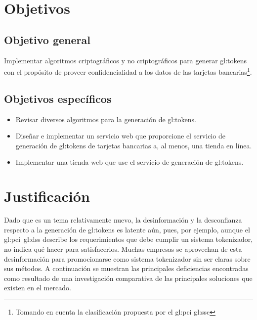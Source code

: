 \section{Objetivos}

\subsection{Objetivo general}

Implementar algoritmos criptográficos y no criptográficos para generar
\glspl{gl:token} con el propósito de proveer confidencialidad a los datos de las
tarjetas bancarias\footnote{Tomando en cuenta la clasificación propuesta por el
\gls{gl:pci} \gls{gl:ssc}}.

\subsection{Objetivos específicos}

\begin{itemize}
  \item Revisar diversos algoritmos para la generación de \glspl{gl:token}.
  \item Diseñar e implementar un servicio web que proporcione el servicio de
    generación de \glspl{gl:token} de tarjetas bancarias a, al menos, una tienda
    en línea.
  \item Implementar una tienda web que use el servicio de generación de
    \glspl{gl:token}.
\end{itemize}

\section{Justificación}

Dado que es un tema relativamente nuevo, la desinformación y la desconfianza
respecto a la generación de \glspl{gl:token} es latente aún, pues, por ejemplo,
aunque el \gls{gl:pci}~\gls{gl:dss} describe los requerimientos que debe cumplir
un sistema tokenizador, no indica qué hacer para satisfacerlos. Muchas empresas
se aprovechan de esta desinformación para promocionarse como sistema
tokenizador sin ser claras sobre sus métodos. A continuación se muestran las
principales deficiencias encontradas como resultado de una investigación
comparativa de las principales soluciones que existen en el mercado.

